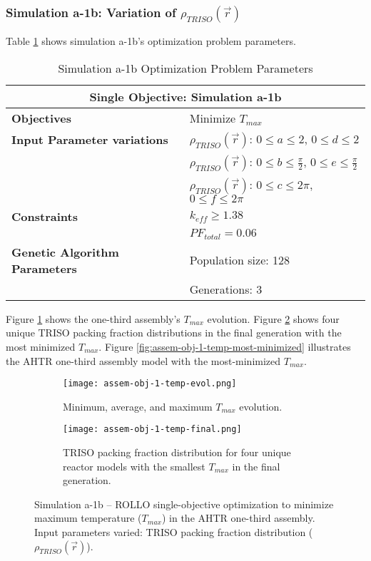\subsubsection{Simulation a-1b: Variation of $\rho_{TRISO}(\vec{r})$}
Table \ref{tab:simulationa1b} shows simulation a-1b's optimization problem parameters. 
\begin{table}[htbp!]
    \centering
    \onehalfspacing
    \caption{Simulation a-1b Optimization Problem Parameters}
	\label{tab:simulationa1b}
    \footnotesize
    \begin{tabular}{l|p{5.3cm}}
    \hline 
    \multicolumn{2}{c}{\textbf{Single Objective: Simulation a-1b}} \\
    \hline 
    \textbf{Objectives} & Minimize $T_{max}$ \\
    \hline 
    \textbf{Input Parameter variations} 
    & $\rho_{TRISO}(\vec{r})$: $0 \leq a \leq 2$, $0 \leq d \leq 2$\\
    & $\rho_{TRISO}(\vec{r})$: $0 \leq b \leq \frac{\pi}{2}$, $0 \leq e \leq \frac{\pi}{2}$\\
    & $\rho_{TRISO}(\vec{r})$: $0 \leq c \leq 2\pi$, $0 \leq f \leq 2\pi$\\
    \hline
    \textbf{Constraints} & $k_{eff} \geq 1.38$\\ 
    & $PF_{total} = 0.06 $\\ 
    \hline 
    \textbf{Genetic Algorithm Parameters} & Population size: 128 \\
    & Generations: 3 \\
    \hline
    \end{tabular}
\end{table}
Figure \ref{fig:assem-obj-1-temp-evol} shows the one-third assembly's $T_{max}$ 
evolution. 
Figure \ref{fig:assem-obj-1-temp-final} shows four unique TRISO packing fraction 
distributions in the final generation with the most minimized $T_{max}$. 
Figure \ref{fig:assem-obj-1-temp-most-minimized} illustrates the \gls{AHTR} one-third 
assembly model with the most-minimized $T_{max}$. 
\begin{figure}[htbp!]
    \begin{subfigure}{\textwidth}
        \centering
        \texttt{[image: assem-obj-1-temp-evol.png]}
        \caption{Minimum, average, and maximum $T_{max}$ evolution.}
        \label{fig:assem-obj-1-temp-evol} 
    \end{subfigure}
    \begin{subfigure}{\textwidth}
        \centering
        \texttt{[image: assem-obj-1-temp-final.png]}
        \caption{TRISO packing fraction distribution for four unique reactor models with the 
        smallest $T_{max}$ in the final generation.}
        \label{fig:assem-obj-1-temp-final} 
    \end{subfigure}
    \caption{Simulation a-1b -- ROLLO single-objective optimization to minimize maximum 
    temperature ($T_{max}$) in the \gls{AHTR} one-third assembly. 
    Input parameters varied: \gls{TRISO} packing fraction distribution 
    ($\rho_{TRISO}(\vec{r})$).}
    \label{fig:assem-obj-1-temp}
\end{figure}
